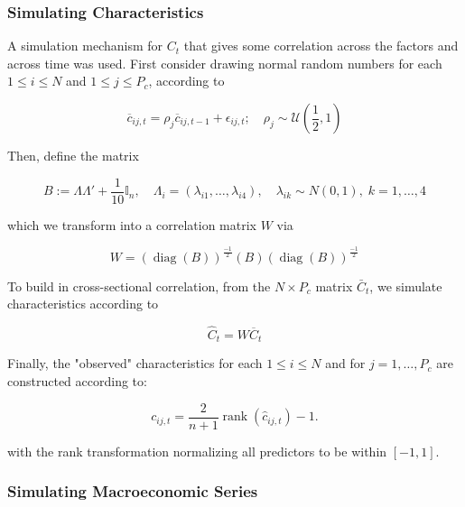 \documentclass[a4paper]{article}
\begin{document}
	\subsubsection{Simulating Characteristics}
	
	A simulation mechanism for $C_t$ that gives some correlation across the factors and across time was used. First consider drawing normal random numbers for each $1\leq i\leq N$ and $1\leq j\leq P_{c}$, according to 
	
	\begin{equation}
	\overline{c}_{i j, t} = \rho_{j} \overline{c}_{i j, t-1}+\epsilon_{i j, t} ;
	\quad \rho_{j} \sim \mathcal{U} \left( \frac{1}{2},1 \right) 
	\end{equation}
	
	Then, define the matrix 
	
	\begin{equation}
	B:=\Lambda\Lambda' + \frac{1}{10}\mathbb{I}_{n}, \quad
	\Lambda_i = (\lambda_{i1},\dots,\lambda_{i4}), \quad
	\lambda_{ik}\sim N(0,1), \; k=1,\dots,4
	\end{equation}
	
	which we transform into a correlation matrix $W$ via
	
	\begin{equation}
	W = \left( \operatorname{diag}(B) \right) ^{\frac{-1}{2}}
	(B)
	\left( \operatorname{diag}(B) \right) ^{\frac{-1}{2}}
	\end{equation}
	
	To build in cross-sectional correlation, from the $N\times P_{c}$ matrix $\bar{C}_t$, we simulate characteristics according to
	
	\begin{equation}
	\widehat{C}_{t}=W\overline{C}_{t}
	\end{equation}
	
	Finally, the "observed" characteristics for each $1\leq i\leq N$ and for $j=1, \dots, P_{c}$ are constructed according to:
	
	\begin{equation}
	c_{i j, t} = \frac{2}{n+1} \operatorname{rank}\left(\hat{c}_{i j, t}\right) - 1.
	\end{equation}
	
	with the rank transformation normalizing all predictors to be within $[-1, 1]$. 
	
	\subsubsection{Simulating Macroeconomic Series}
	
\end{document}
